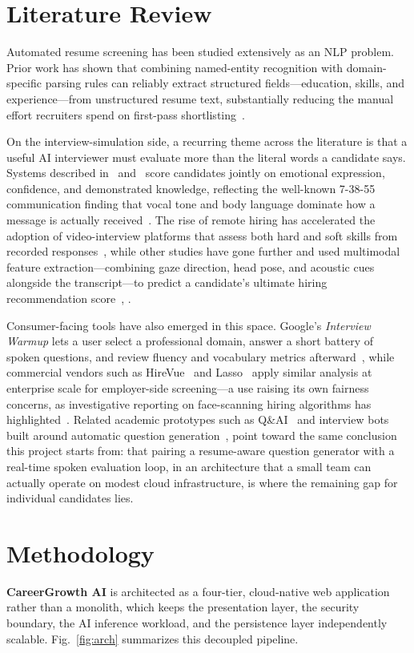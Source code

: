 \documentclass[conference]{IEEEtran}
\begin{document}
\section{Literature Review}
Automated resume screening has been studied extensively as an NLP problem. Prior work has shown that combining named-entity recognition with domain-specific parsing rules can reliably extract structured fields---education, skills, and experience---from unstructured resume text, substantially reducing the manual effort recruiters spend on first-pass shortlisting~\cite{b7}.

On the interview-simulation side, a recurring theme across the literature is that a useful AI interviewer must evaluate more than the literal words a candidate says. Systems described in~\cite{b1} and~\cite{b14} score candidates jointly on emotional expression, confidence, and demonstrated knowledge, reflecting the well-known 7-38-55 communication finding that vocal tone and body language dominate how a message is actually received~\cite{b10}. The rise of remote hiring has accelerated the adoption of video-interview platforms that assess both hard and soft skills from recorded responses~\cite{b3}, while other studies have gone further and used multimodal feature extraction---combining gaze direction, head pose, and acoustic cues alongside the transcript---to predict a candidate's ultimate hiring recommendation score~\cite{b12}, \cite{b13}.

Consumer-facing tools have also emerged in this space. Google's \textit{Interview Warmup} lets a user select a professional domain, answer a short battery of spoken questions, and review fluency and vocabulary metrics afterward~\cite{b15}, while commercial vendors such as HireVue~\cite{b4} and Lasso~\cite{b8} apply similar analysis at enterprise scale for employer-side screening---a use raising its own fairness concerns, as investigative reporting on face-scanning hiring algorithms has highlighted~\cite{b6}. Related academic prototypes such as Q\&AI~\cite{b1} and interview bots built around automatic question generation~\cite{b3}, \cite{b5} point toward the same conclusion this project starts from: that pairing a resume-aware question generator with a real-time spoken evaluation loop, in an architecture that a small team can actually operate on modest cloud infrastructure, is where the remaining gap for individual candidates lies.

\section{Methodology}
\textbf{CareerGrowth AI} is architected as a four-tier, cloud-native web application rather than a monolith, which keeps the presentation layer, the security boundary, the AI inference workload, and the persistence layer independently scalable. Fig.~\ref{fig:arch} summarizes this decoupled pipeline.
\end{document}

